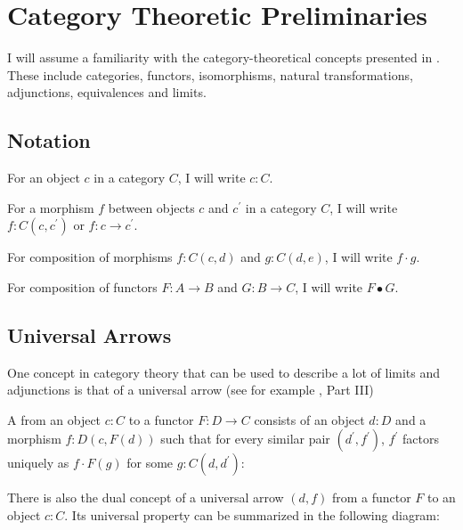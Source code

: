 \chapter{Category Theoretic Preliminaries}

I will assume a familiarity with the category-theoretical concepts presented in \cite{CT4P}. These include categories, functors, isomorphisms, natural transformations, adjunctions, equivalences and limits.

\section{Notation}
For an object $ c $ in a category $ C $, I will write $ c: C $.

For a morphism $ f $ between objects $ c $ and $ c^\prime $ in a category $ C $, I will write $ f: C(c, c^\prime) $ or $ f: c \to c^\prime $.

For composition of morphisms $ f: C(c, d) $ and $ g: C(d, e) $, I will write $ f \cdot g $.

For composition of functors $ F: A \to B $ and $ G: B \to C $, I will write $ F \bullet G $.

\section{Universal Arrows}

One concept in category theory that can be used to describe a lot of limits and adjunctions is that of a universal arrow (see for example \cite{MacLane}, Part III)
\begin{definition}
  A  from an object $ c: C $ to a functor $ F: D \to C $ consists of an object $ d: D $ and a morphism $ f: D(c, F(d)) $ such that for every similar pair $ (d^\prime, f^\prime) $, $ f^\prime $ factors uniquely as $ f \cdot F(g) $ for some $ g: C(d, d^\prime) $:
  \begin{center}
  \end{center}
\end{definition}

There is also the dual concept of a universal arrow $ (d, f) $ from a functor $ F $ to an object $ c: C $. Its universal property can be summarized in the following diagram:
\begin{center}
\end{center}

